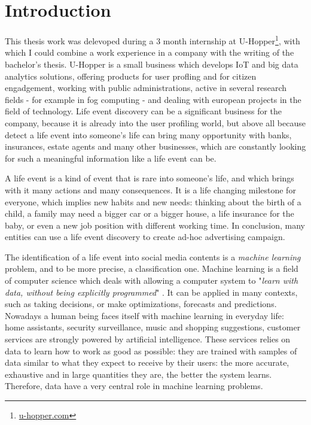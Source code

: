 \chapter{Introduction}
\label{cha:intro}

This thesis work was delevoped during a 3 month internship at U-Hopper\footnote{\url{u-hopper.com}}, with which I could combine a work experience in a company with the writing of the bachelor's thesis. U-Hopper is a small business which develops IoT and big data analytics solutions, offering products for user profling and for citizen engadgement, working with public administrations, active in several research fields - for example in fog computing - and dealing with european projects in the field of technology. Life event discovery can be a significant business for the company, because it is already into the user profiling world, but above all because detect a life event into someone's life can bring many opportunity with banks, insurances, estate agents and many other businesses, which are constantly looking for such a meaningful information like a life event can be.

A life event is a kind of event that is rare into someone's life, and which brings with it many actions and many consequences. It is a life changing milestone for everyone, which implies new habits and new needs: thinking about the birth of a child, a family may need a bigger car or a bigger house, a life insurance for the baby, or even a new job position with different working time. In conclusion, many entities can use a life event discovery to create ad-hoc advertising campaign. 

The identification of a life event into social media contents is a \textit{machine learning} problem, and to be more precise, a classification one. Machine learning is a field of computer science which deals with allowing a computer system to "\textit{learn with data, without being explicitly programmed}" \cite{samuel1959some}. It can be applied in many contexts, such as taking decisions, or make optimizations, forecasts and predictions. Nowadays a human being faces itself with machine learning in everyday life: home assistants, security surveillance, music and shopping suggestions, customer services are strongly powered by artificial intelligence. These services relies on data to learn how to work as good as possible: they are trained with samples of data similar to what they expect to receive by their users: the more accurate, exhaustive and in large quantities they are, the better the system learns. Therefore, data have a very central role in machine learning problems.

